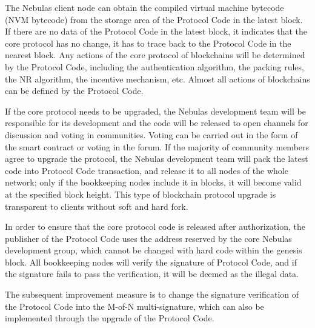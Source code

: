 The Nebulas client node can obtain the compiled virtual machine bytecode (NVM bytecode) from the storage area of the Protocol Code in the latest block. If there are no data of the Protocol Code in the latest block, it indicates that the core protocol has no change, it has to trace back to the Protocol Code in the nearest block. Any actions of the core protocol of blockchains will be determined by the Protocol Code, including the authentication algorithm, the packing rules, the NR algorithm, the incentive mechanism, etc. Almost all actions of blockchains can be defined by the Protocol Code.

If the core protocol needs to be upgraded, the Nebulas development team will be responsible for its development and the code will be released to open channels for discussion and voting in communities. Voting can be carried out in the form of the smart contract or voting in the forum. If the majority of community members agree to upgrade the protocol, the Nebulas development team will pack the latest code into Protocol Code transaction, and release it to all nodes of the whole network; only if the bookkeeping nodes include it in blocks, it will become valid at the specified block height. This type of blockchain protocol upgrade is transparent to clients without soft and hard fork.



In order to ensure that the core protocol code is released after authorization, the publisher of the Protocol Code uses the address reserved by the core Nebulas development group, which cannot be changed with hard code within the genesis block. All bookkeeping nodes will verify the signature of Protocol Code, and if the signature fails to pass the verification, it will be deemed as the illegal data.


The subsequent improvement measure is to change the signature verification of the Protocol Code into the M-of-N multi-signature, which can also be implemented through the upgrade of the Protocol Code.

